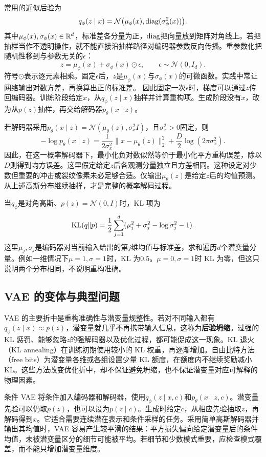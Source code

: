 常用的近似后验为
\[
q_{\phi}(z\mid x)=\mathcal N\bigl(\mu_{\phi}(x),\operatorname{diag}(\sigma_{\phi}^2(x))\bigr).
\]
其中$\mu_{\phi}(x),\sigma_{\phi}(x)\in\mathbb{R}^d$，标准差各分量为正，$\operatorname{diag}$把向量放到矩阵对角线上。若把抽样当作不透明操作，就不能直接沿抽样路径对编码器参数反向传播。重参数化把随机性移到与参数无关的$\epsilon$：
\begin{equation}
z=\mu_{\phi}(x)+\sigma_{\phi}(x)\odot\epsilon,
\qquad \epsilon\sim\mathcal N(0,I_d).
\end{equation}
符号$\odot$表示逐元素相乘。固定$\epsilon$后，$z$是$\mu_\phi(x)$与$\sigma_\phi(x)$的可微函数。实践中常让网络输出对数方差，再换算出正的标准差。
因此固定一次$\epsilon$时，梯度可以通过$z$传回编码器。训练阶段给定$x$，从$q_{\phi}(z\mid x)$抽样并计算重构项。生成阶段没有$x$，改为从$p(z)$抽样，再交给解码器$p_{\theta}(x\mid z)$。

若解码器采用$p_{\theta}(x\mid z)=\mathcal N(\mu_{\theta}(z),\sigma_x^2I)$，且$\sigma_x^2>0$固定，则
\[
-\log p_{\theta}(x\mid z)=\frac{1}{2\sigma_x^2}\|x-\mu_{\theta}(z)\|_2^2+\frac D2\log(2\pi\sigma_x^2).
\]
因此，在这一概率解码器下，最小化负对数似然等价于最小化平方重构误差，除以$D$则得到均方误差。这里假定给定$z$后各观测分量独立且方差相同。这种设定对少数但重要的冲击或裂纹像素未必足够合适。仅输出$\mu_{\theta}(z)$是给定$z$后的均值预测。从上述高斯分布继续抽样，才是完整的概率解码过程。

当$q_{\phi}$是对角高斯、$p(z)=\mathcal N(0,I)$时，KL 项为
\[
\operatorname{KL}(q\|p)=\frac12\sum_{j=1}^{d}(\mu_j^2+\sigma_j^2-\log\sigma_j^2-1).
\]
这里$\mu_j,\sigma_j$是编码器对当前输入给出的第$j$维均值与标准差，求和遍历$d$个潜变量分量。例如一维情况下$\mu=1,\sigma=1$时，KL 为$0.5$。$\mu=0,\sigma=1$时 KL 为零，但这只说明两个分布相同，不说明重构准确。

\subsection{VAE 的变体与典型问题}

VAE 的主要折中是重构准确性与潜变量规整性。若对不同输入都有$q_{\phi}(z\mid x)\approx p(z)$，潜变量就几乎不再携带输入信息，这称为\textbf{后验坍缩}。过强的 KL 惩罚、能够忽略$z$的强解码器以及优化过程，都可能促成这一现象。KL 退火（KL annealing）在训练初期使用较小的 KL 权重，再逐渐增加。自由比特方法（free bits）为潜变量各维或各组设置少量 KL 额度，在额度内不继续奖励减小 KL。这些方法改变优化折中，却不保证避免坍缩，也不保证潜变量对应可解释的物理因素。

条件 VAE 将条件加入编码器和解码器，使用$q_{\phi}(z\mid x,c)$和$p_{\theta}(x\mid z,c)$。潜变量先验可以仍取$p(z)$，也可以设为$p(z\mid c)$。生成时给定$c$，从相应先验抽取$z$，再解码得到$x$。它适合需要连续潜在表示和条件采样的任务。采用简单高斯解码器并输出其均值时，VAE 容易产生较平滑的结果：平方损失偏向给定潜变量后的条件均值，未被潜变量区分的细节可能被平均。若细节和少数模式重要，应检查模式覆盖，而不能只增加潜变量维度。

